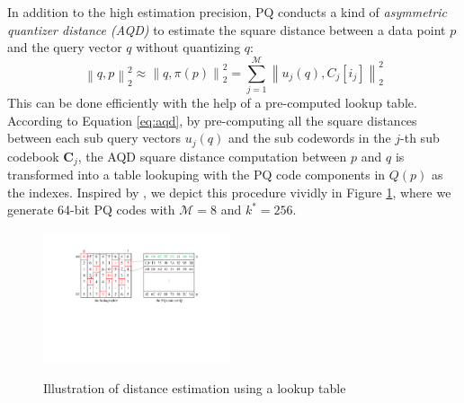\documentclass[twocolumn]{svjour3}          %
\begin{document}
In addition to the high estimation precision, PQ conducts a kind of \emph{asymmetric quantizer distance (AQD)} to estimate the square distance between a data point $p$ and the query vector $q$ without quantizing $q$:
\begin{equation}
\label{eq:aqd}
\left\| {q,p} \right\|_2^2 \approx \left\| {q,\pi \left( p \right)} \right\|_2^2 = \sum\limits_{j = 1}^\mathcal{M} {\left\| {{u_j}\left( q \right),{C_j}\left[ {{i_j}} \right]} \right\|_2^2}
\end{equation}
This can be done efficiently with the help of a pre-computed lookup table. According to Equation \ref{eq:aqd}, by pre-computing all the square distances between each sub query vectors $u_j(q)$ and the sub codewords in the $j$-th sub codebook $\textbf{C}_j$, the AQD square distance computation between $p$ and $q$ is transformed into a table lookuping with the PQ code components in $Q(p)$ as the indexes. Inspired by \cite{andre2015cachePQ}, we depict this procedure vividly in Figure \ref{fig:lookup}, where we generate 64-bit PQ codes with $\mathcal{M}=8$ and $k^*=256$.
\begin{figure}[t]
\begin{center}
{
\includegraphics[width=0.49\textwidth]{lookup.pdf}
}
\end{center}
\caption{Illustration of distance estimation using a lookup table}
\label{fig:lookup}
\end{figure}
\end{document}
